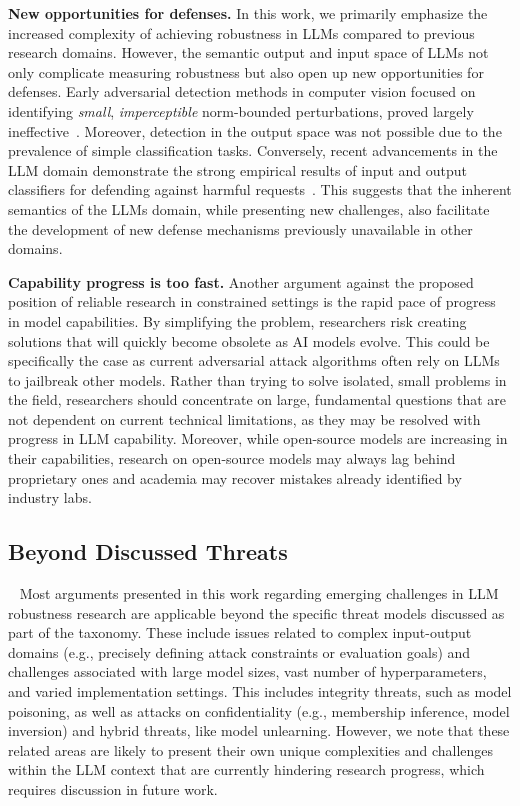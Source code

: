\textbf{New opportunities for defenses.} In this work, we primarily emphasize the increased complexity of achieving robustness in LLMs compared to previous research domains. However, the semantic output and input space of LLMs not only complicate measuring robustness but also open up new opportunities for defenses. Early adversarial detection methods in computer vision focused on identifying \textit{small}, \textit{imperceptible} norm-bounded perturbations, proved largely ineffective~\cite{carlini2017adversarial}. Moreover, detection in the output space was not possible due to the prevalence of simple classification tasks. Conversely, recent advancements in the LLM domain demonstrate the strong empirical results of input and output classifiers for defending against harmful requests~\cite{kim2023robust, sharma2025constitutional}. This suggests that the inherent semantics of the LLMs domain, while presenting new challenges, also facilitate the development of new defense mechanisms previously unavailable in other domains.

\textbf{Capability progress is too fast.} Another argument against the proposed position of reliable research in constrained settings is the rapid pace of progress in model capabilities. By simplifying the problem, researchers risk creating solutions that will quickly become obsolete as AI models evolve. This could be specifically the case as current adversarial attack algorithms often rely on LLMs to jailbreak other models. Rather than trying to solve isolated, small problems in the field, researchers should concentrate on large, fundamental questions that are not dependent on current technical limitations, as they may be resolved with progress in LLM capability. Moreover, while open-source models are increasing in their capabilities, research on open-source models may always lag behind proprietary ones and academia may recover mistakes already identified by industry labs. 

\subsection{Beyond Discussed Threats}~\label{app:beyond}
Most arguments presented in this work regarding emerging challenges in LLM robustness research are applicable beyond the specific threat models discussed as part of the taxonomy. 
These include issues related to complex input-output domains (e.g., precisely defining attack constraints or evaluation goals) and challenges associated with large model sizes, vast number of hyperparameters, and varied implementation settings.
This includes integrity threats, such as model poisoning, as well as attacks on confidentiality (e.g., membership inference, model inversion) and hybrid threats, like model unlearning. 
However, we note that these related areas are likely to present their own unique complexities and challenges within the LLM context that are currently hindering research progress, which requires discussion in future work.

